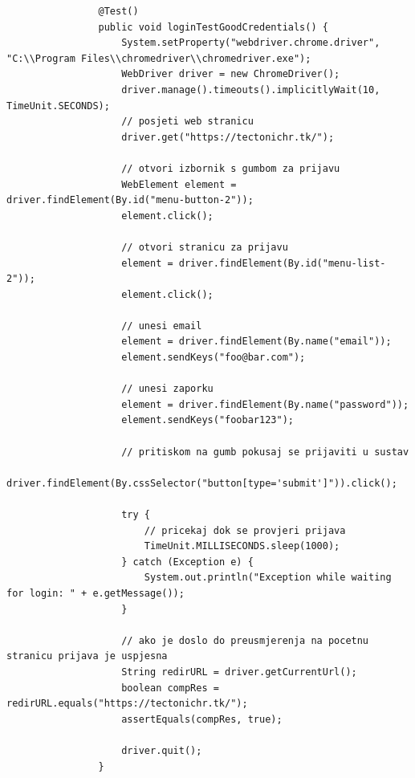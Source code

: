 			 \begin{lstlisting}
				@Test()
				public void loginTestGoodCredentials() {
					System.setProperty("webdriver.chrome.driver", "C:\\Program Files\\chromedriver\\chromedriver.exe");
					WebDriver driver = new ChromeDriver();
					driver.manage().timeouts().implicitlyWait(10, TimeUnit.SECONDS);
					// posjeti web stranicu
					driver.get("https://tectonichr.tk/");

					// otvori izbornik s gumbom za prijavu
					WebElement element = driver.findElement(By.id("menu-button-2"));
					element.click();

					// otvori stranicu za prijavu
					element = driver.findElement(By.id("menu-list-2"));
					element.click();

					// unesi email
					element = driver.findElement(By.name("email"));
					element.sendKeys("foo@bar.com");

					// unesi zaporku
					element = driver.findElement(By.name("password"));
					element.sendKeys("foobar123");

					// pritiskom na gumb pokusaj se prijaviti u sustav
					driver.findElement(By.cssSelector("button[type='submit']")).click();

					try {
						// pricekaj dok se provjeri prijava
						TimeUnit.MILLISECONDS.sleep(1000);
					} catch (Exception e) {
						System.out.println("Exception while waiting for login: " + e.getMessage());
					}

					// ako je doslo do preusmjerenja na pocetnu stranicu prijava je uspjesna
					String redirURL = driver.getCurrentUrl();
					boolean compRes = redirURL.equals("https://tectonichr.tk/");
					assertEquals(compRes, true);

					driver.quit();
				}
			\end{lstlisting}


